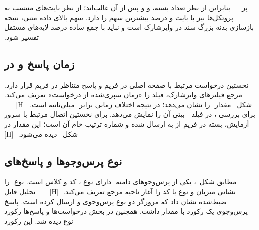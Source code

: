 ‫‌پر
‫
‫
‫
‫
‫بنابراین از نظر تعداد بسته،  و  و پس از آن  غالب‌اند؛ از نظر
‫بایت‌های منتسب به پروتکل‌ها نیز  با  بایت و  درصد بیشترین سهم را دارد.
‫سهم بالای داده متنی، نتیجه بازسازی بدنه بزرگ سند  در وایرشارک است و نباید با جمع
‫ساده درصد لایه‌های مستقل تفسیر شود.
‫
‫\subsection{زمان پاسخ  و  در }
‫
‫نخستین درخواست مرتبط با صفحه اصلی در فریم  و پاسخ  متناظر
‫در فریم  قرار دارد. مرجع فیلترهای وایرشارک، فیلد  را «زمان سپری‌شده از
‫درخواست» تعریف می‌کند. شکل~ مقدار
‫ را نشان می‌دهد؛ در نتیجه اختلاف زمانی برابر
‫ میلی‌ثانیه است.
‫
‫[H]
‫
‫
‫
‫
‫
‫برای بررسی ، در  فیلد
‫ -بیتی آن را نمایش می‌دهد.
‫برای نخستین اتصال  مرتبط با سرور  آزمایش، بسته  در فریم 
‫از  به  ارسال شده و شماره ترتیب خام آن  است؛ این مقدار در
‫شکل~ دیده می‌شود.
‫
‫[H]
‫
‫
‫
‫
‫
‫\subsection{نوع پرس‌وجوها و پاسخ‌های }
‫
‫مطابق شکل~، یکی از پرس‌وجوهای دامنه
‫ دارای نوع ، کد  و کلاس  است.  نوع
‫ را نشانی میزبان و نوع  با کد  را آغاز ناحیه مرجع تعریف می‌کند.
‫
‫[H]
‫
‫
‫
‫
‫
‫تحلیل فایل ضبط‌شده نشان داد که مرورگر دو نوع پرس‌وجوی  و  ارسال کرده است.
‫پاسخ پرس‌وجوی  یک رکورد  با مقدار  داشت. 
‫همچنین در بخش  درخواست‌ها و پاسخ‌ها رکورد  نوع  دیده شد. این رکورد
